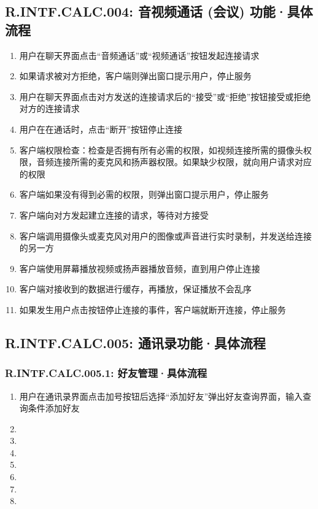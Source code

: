     \subsection{R.INTF.CALC.004: 音视频通话 (会议) 功能·具体流程}
    \begin{enumerate}
        \item 用户在聊天界面点击“音频通话”或“视频通话”按钮发起连接请求
        \item 如果请求被对方拒绝，客户端则弹出窗口提示用户，停止服务
        \item 用户在聊天界面点击对方发送的连接请求后的“接受”或“拒绝”按钮接受或拒绝对方的连接请求
        \item 用户在在通话时，点击“断开”按钮停止连接
        \item 客户端权限检查：检查是否拥有所有必需的权限，如视频连接所需的摄像头权限，音频连接所需的麦克风和扬声器权限。如果缺少权限，就向用户请求对应的权限
        \item 客户端如果没有得到必需的权限，则弹出窗口提示用户，停止服务
        \item 客户端向对方发起建立连接的请求，等待对方接受
        \item 客户端调用摄像头或麦克风对用户的图像或声音进行实时录制，并发送给连接的另一方
        \item 客户端使用屏幕播放视频或扬声器播放音频，直到用户停止连接
        \item 客户端对接收到的数据进行缓存，再播放，保证播放不会乱序
        \item 如果发生用户点击按钮停止连接的事件，客户端就断开连接，停止服务
    \end{enumerate}
    \subsection{R.INTF.CALC.005: 通讯录功能·具体流程}
        \subsubsection{R.INTF.CALC.005.1: 好友管理·具体流程}
        \begin{enumerate}
            \item 用户在通讯录界面点击加号按钮后选择“添加好友”弹出好友查询界面，输入查询条件添加好友
            \item 
            \item 
            \item 
            \item 
            \item 
            \item 
            \item 
        \end{enumerate}
